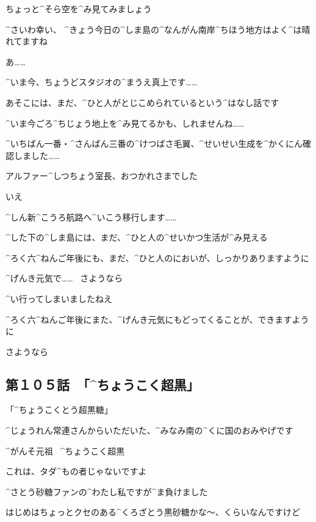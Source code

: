 \Person ちょっと^{そら}{空}を^{み}{見}てみましょう

\Person ^{さいわ}{幸}い、
^{きょう}{今日}の^{しま}{島}の^{なんがん}{南岸}^{ちほう}{地方}はよく^{は}{晴}れてますね

\page[63]
\Person あ……

\Person ^{いま}{今}、ちょうどスタジオの^{まうえ}{真上}です……

\page[65]
\Person あそこには、まだ、^{ひと}{人}がとじこめられているという^{はなし}{話}です

\Person ^{いま}{今}ごろ^{ちじょう}{地上}を^{み}{見}てるかも、しれませんね……

\page[69]
\Person ^{いちばん}{一番}・^{さんばん}{三番}の^{けつばさ}{毛翼}、^{せいせい}{生成}を^{かくにん}{確認}しました……

\Person アルファー^{しつちょう}{室長}、おつかれさまでした

\ASevenMOne いえ

\Person ^{しん}{新}^{こうろ}{航路}へ^{いこう}{移行}します……

\page[70]
\ASevenMOne ^{した}{下}の^{しま}{島}には、まだ、^{ひと}{人}の^{せいかつ}{生活}が^{み}{見}える

\ASevenMOne ^{ろく}{六}^{ねんご}{年後}にも、まだ、^{ひと}{人}のにおいが、しっかりありますように

\ASevenMOne ^{げんき}{元気}で……
\ さようなら

\page[71]
\Person ^{い}{行}ってしまいましたねえ

\page[72]
\Person ^{ろく}{六}^{ねんご}{年後}にまた、^{げんき}{元気}にもどってくることが、できますように

\Person さようなら


\subsection{第１０５話\ 「^{ちょうこく}{超黒}」}

\page[74]
\Alpha 「^{ちょうこくとう}{超黒糖}」

\Alpha ^{じょうれん}{常連}さんからいただいた、^{みなみ}{南}の^{くに}{国}のおみやげです

\Sign ^{がんそ}{元祖}
\ ^{ちょうこく}{超黒}

\Alpha これは、タダ^{もの}{者}じゃないですよ

\Alpha ^{さとう}{砂糖}ファンの^{わたし}{私}ですが^{ま}{負}けました

\page[75]
\Alpha はじめはちょっとクセのある^{くろざとう}{黒砂糖}かな〜、くらいなんですけど

